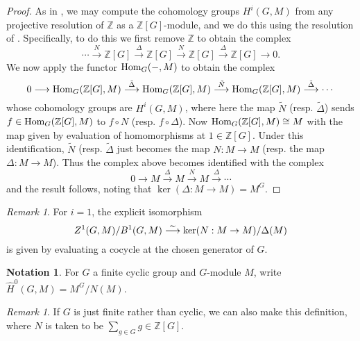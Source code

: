 \documentclass[11pt]{amsart}
\numberwithin{equation}{section}
\theoremstyle{remark}
\newtheorem{remark}[equation]{Remark}
\theoremstyle{remark}
\theoremstyle{remark}
\theoremstyle{definition}
\theoremstyle{definition}
\theoremstyle{definition}
\theoremstyle{definition}
\newtheorem{notation}[equation]{Notation}
\theoremstyle{definition}
\theoremstyle{definition}
\begin{document}
\begin{proof}
As in , we may compute the cohomology groups $H^i(G,M)$ from any projective resolution of $\mathbb{Z}$ as a $\mathbb{Z}[G]$-module, and we do this using the resolution of . Specifically, to do this we first remove $\mathbb{Z}$ to obtain the complex 
\[\cdots \stackrel{N}{\longrightarrow}\mathbb{Z}[G]\stackrel{\Delta}{\longrightarrow}\mathbb{Z}[G]\stackrel{N}{\longrightarrow}\mathbb{Z}[G] \stackrel{\Delta}{\longrightarrow} \mathbb{Z}[G]  \longrightarrow 0.\]
We now apply the functor $\textup{Hom}_G(-,M)$ to obtain the complex 
\[0\longrightarrow \textup{Hom}_G(\mathbb{Z}[G],M)\stackrel{\tilde{\Delta}}{\longrightarrow}\textup{Hom}_G(\mathbb{Z}[G],M)\stackrel{\tilde{N}}{\longrightarrow}\textup{Hom}_G(\mathbb{Z}[G],M)\stackrel{\tilde{\Delta}}{\longrightarrow}\cdots\]
whose cohomology groups are $H^i(G,M)$, where here the map $\tilde{N}$ (resp. $\tilde{\Delta}$) sends $f\in \textup{Hom}_G(\mathbb{Z}[G],M)$ to $f\circ N$ (resp. $f\circ \Delta$). Now  $\textup{Hom}_G(\mathbb{Z}[G],M)\cong M$ with the map given by evaluation of homomorphisms at $1\in \mathbb{Z}[G]$. Under this identification, $\tilde{N}$ (resp. $\tilde{\Delta}$ just becomes the map $N:M\rightarrow M$ (resp. the map $\Delta:M\rightarrow M$). Thus the complex above becomes identified with the complex
\[0\longrightarrow M\stackrel{\Delta}{\longrightarrow}M\stackrel{N}{\longrightarrow}M \stackrel{\Delta}{\longrightarrow}\cdots \]
and the result follows, noting that $\ker(\Delta:M\rightarrow M)=M^G$.
\end{proof}

\begin{remark}
For $i=1$, the explicit isomorphism 
\[Z^1(G,M)/B^1(G,M)\stackrel{\sim}{\longrightarrow}\textup{ker}(N:M\rightarrow M)/\Delta(M)\]
is given by evaluating a cocycle at the chosen generator of $G$.
\end{remark}

\begin{notation}
For $G$ a finite cyclic group and $G$-module $M$, write $\widehat{H}^0(G,M)=M^G/N(M)$.
\end{notation}

\begin{remark}
If $G$ is just finite rather than cyclic, we can also make this definition, where $N$ is taken to be $\sum_{g\in G}g\in\mathbb{Z}[G]$. 
\end{remark}
\end{document}
